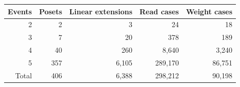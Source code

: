 \begin{tabular}{rrrrr}
\toprule
Events & Posets & Linear extensions & Read cases & Weight cases\\
\midrule
2 & 2 & 3 & 24 & 18\\
3 & 7 & 20 & 378 & 189\\
4 & 40 & 260 & 8,640 & 3,240\\
5 & 357 & 6,105 & 289,170 & 86,751\\
\midrule
Total & 406 & 6,388 & 298,212 & 90,198\\
\bottomrule
\end{tabular}
